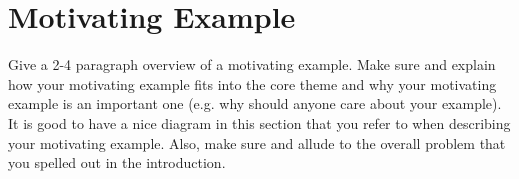 \section{Motivating Example}
\label{motivation}

Give a 2-4 paragraph overview of a motivating
example. Make sure and explain how your motivating
example fits into the core theme and why your
motivating example is an important one (e.g. why
should anyone care about your example). It is
good to have a nice diagram in this section that
you refer to when describing your motivating
example. Also, make sure and allude to the
overall problem that you spelled out in the
introduction.